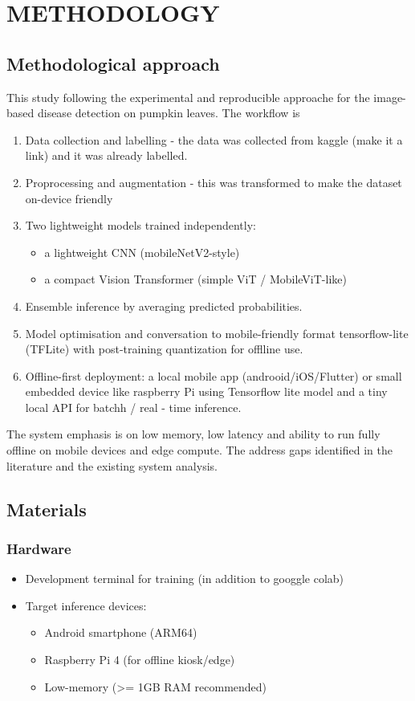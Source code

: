 \chapter{\nameTitleSpace METHODOLOGY}
\section{Methodological approach}
This study following the experimental and reproducible approache for the image-based disease detection on pumpkin leaves. The workflow is 
\begin{enumerate}
	\item Data collection and labelling - the data was collected from kaggle (make it a link) and it was already labelled. 
	\item Proprocessing and augmentation - this was transformed to make the dataset on-device friendly 
	\item Two lightweight models trained independently:
	\begin{itemize}
		\item a lightweight CNN (mobileNetV2-style)
		\item a compact Vision Transformer (simple ViT / MobileViT-like)
	\end{itemize}
	\item Ensemble inference by averaging predicted probabilities.
	\item Model optimisation and conversation to mobile-friendly format tensorflow-lite (TFLite) with post-training quantization for offlline use.
	\item Offline-first deployment: a local mobile app (androoid/iOS/Flutter) or small embedded device like raspberry Pi using Tensorflow lite model and a tiny local API for batchh / real - time inference. 
\end{enumerate}

The system emphasis is on low memory, low latency and ability to run fully offline on mobile devices and edge compute. The address gaps identified in the literature and the existing system analysis.
\section{Materials}
\subsection{Hardware}
\begin{itemize}
	\item Development terminal for training (in addition to googgle colab)
	\item Target inference devices: 
		\begin{itemize}
			\item Android smartphone (ARM64)
			\item Raspberry Pi 4 (for offline kiosk/edge)
			\item Low-memory (>= 1GB RAM recommended)
		\end{itemize}
\end{itemize}

